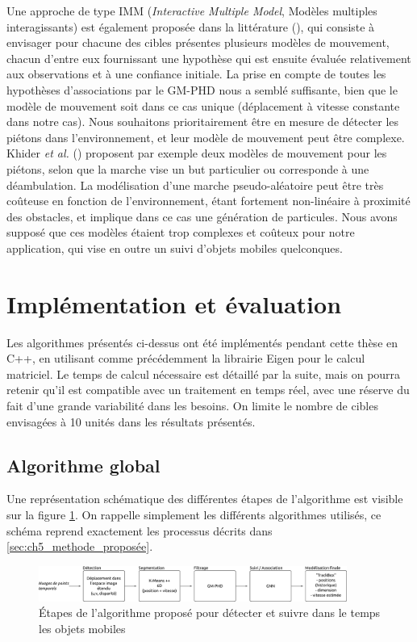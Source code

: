 Une approche de type IMM (\emph{Interactive Multiple Model}, Modèles multiples interagissants) est également proposée dans la littérature (\cite{Blackman2004}), qui consiste à envisager pour chacune des cibles présentes plusieurs modèles de mouvement, chacun d'entre eux fournissant une hypothèse qui est ensuite évaluée relativement aux observations et à une confiance initiale. La prise en compte de toutes les hypothèses d'associations par le GM-PHD nous a semblé suffisante, bien que le modèle de mouvement soit dans ce cas unique (déplacement à vitesse constante dans notre cas). Nous souhaitons prioritairement être en mesure de détecter les piétons dans l'environnement, et leur modèle de mouvement peut être complexe. Khider \textit{et al.} (\cite{Khider2012}) proposent par exemple deux modèles de mouvement pour les piétons, selon que la marche vise un but particulier ou corresponde à une déambulation. La modélisation d'une marche pseudo-aléatoire peut être très coûteuse en fonction de l'environnement, étant fortement non-linéaire à proximité des obstacles, et implique dans ce cas une génération de particules. Nous avons supposé que ces modèles étaient trop complexes et coûteux pour notre application, qui vise en outre un suivi d'objets mobiles quelconques.

\section{Implémentation et évaluation}
Les algorithmes présentés ci-dessus ont été implémentés pendant cette thèse en C++, en utilisant comme précédemment la librairie Eigen pour le calcul matriciel. Le temps de calcul nécessaire est détaillé par la suite, mais on pourra retenir qu'il est compatible avec un traitement en temps réel, avec une réserve du fait d'une grande variabilité dans les besoins. On limite le nombre de cibles envisagées à 10 unités dans les résultats présentés.

\subsection{Algorithme global}
Une représentation schématique des différentes étapes de l'algorithme est visible sur la figure \ref{fig:ch5_schema_global}. On rappelle simplement les différents algorithmes utilisés, ce schéma reprend exactement les processus décrits dans \ref{sec:ch5_methode_proposée}.

\begin{figure}
	\centering
	\includegraphics[width = 0.9\textwidth]{Chapter5/graphics/schema_global.png}
	\caption{Étapes de l'algorithme proposé pour détecter et suivre dans le temps les objets mobiles}
	\label{fig:ch5_schema_global}
\end{figure}


